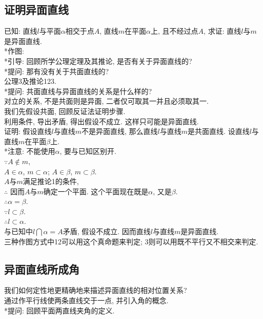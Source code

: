 \documentclass{article}
\begin{document}
\begin{CJK}{UTF8}{gkai}
\subsection{证明异面直线}
已知: 直线$l$与平面$\alpha$相交于点$A$, 直线$m$在平面$\alpha$上, 且不经过点$A$, 求证: 直线$l$与$m$是异面直线.\\
*作图: \\
*引导: 回顾所学公理定理及其推论, 是否有关于异面直线的?\\
*提问: 那有没有关于共面直线的?\\
公理3及推论123.\\
*提问: 共面直线与异面直线的关系是什么样的?\\
对立的关系, 不是共面则是异面, 二者仅可取其一并且必须取其一.\\
我们先假设共面, 回顾反证法证明步骤.\\
利用条件, 导出矛盾, 得出假设不成立. 这样只可能是异面直线.\\
证明: 假设直线$l$与直线$m$不是异面直线, 那么直线$l$与直线$m$是共面直线. 设直线$l$与直线$m$在平面$\beta$上.\\
*注意: 不能使用$\alpha$, 要与已知区别开.\\
$\because A \notin m$,\\
$A \in \alpha$, $m \subset \alpha$; $A \in \beta$, $m \subset \beta$.\\
$A$与$m$满足推论1的条件, \\
$\therefore$ 因而$A$与$m$确定一个平面. 这个平面现在既是$\alpha$, 又是$\beta$.\\
$\therefore \alpha = \beta$.\\
$\because l \subset \beta$.\\
$\therefore l \subset \alpha$.\\
与已知中$l \bigcap \alpha = A$矛盾, 假设不成立. 因而直线$l$与直线$m$是异面直线.\\
\newline
三种作图方式中12可以用这个真命题来判定; 3则可以用既不平行又不相交来判定.

\subsection{异面直线所成角}
我们如何定性地更精确地来描述异面直线的相对位置关系?\\
通过作平行线使两条直线交于一点, 并引入角的概念.\\
*提问: 回顾平面两直线夹角的定义.

\end{CJK}
\end{document}
